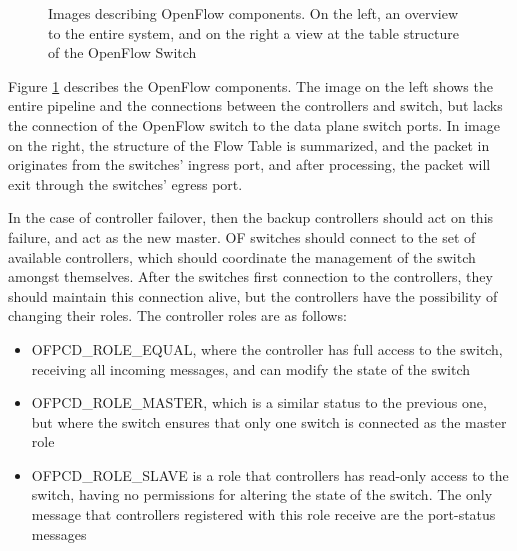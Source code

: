 \begin {enumerate}
\begin{figure} [h]
    \centering
    \begin{subfigure}
    \texttt{[image: sdn/open\_flow\_switch\_pipeline]}
    \end{subfigure}
    \begin{subfigure}
    \texttt{[image: sdn/open\_flow\_tables]}
    \end{subfigure}
    \caption{Images describing OpenFlow components. On the left, an overview to the entire system, and on the right a view at the table structure of the 
    OpenFlow Switch \cite{open_networking_foundation_openflow_2015}}
    \label{fig:of_switch}
\end{figure}

\par Figure \ref{fig:of_switch} describes the OpenFlow components. The image on the left shows the entire pipeline and the connections between the controllers and
switch, but lacks the connection of the OpenFlow switch to the data plane switch ports. In image on the right, the structure of the Flow Table is summarized, 
and the packet in originates from the switches' ingress port, and after processing, the packet will exit through the switches' egress port.

\par In the case of controller failover, then the backup controllers should act on this failure, and act as the new master. OF switches should connect to the set of
available controllers, which should coordinate the management of the switch amongst themselves. After the switches first connection to the controllers, they should
maintain this connection alive, but the controllers have the possibility of changing their roles. The controller roles are as follows:

\begin {itemize}
    \item \textsc {OFPCD\_ROLE\_EQUAL}, where the controller has full access to the switch, receiving all incoming messages, and can modify the state of the switch
    \item \textsc {OFPCD\_ROLE\_MASTER}, which is a similar status to the previous one, but where the switch ensures that only one switch is connected as the master
        role
    \item \textsc {OFPCD\_ROLE\_SLAVE} is a role that controllers has read-only access to the switch, having no permissions for altering the state of the switch.
        The only message that controllers registered with this role receive are the port-status messages
\end {itemize}


\end{enumerate}
